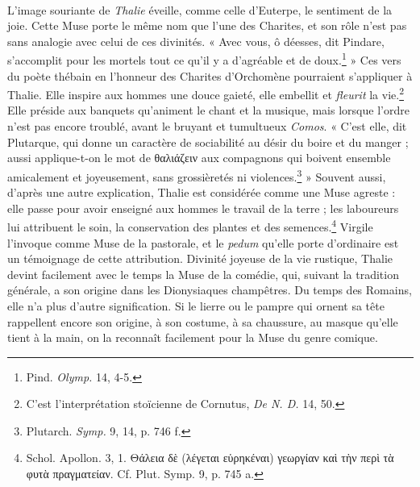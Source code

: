 \documentclass[a4paper, 11pt, oneside, polutonikogreek, french]{article}
\begin{document}
\paragraph{}
L'image souriante de \emph{Thalie} éveille, comme celle d'Euterpe, le sentiment de la joie. Cette Muse porte le même nom que l'une des Charites, et son rôle n'est pas sans analogie avec celui de ces divinités. « Avec vous, ô déesses, dit Pindare, s'accomplit pour les mortels tout ce qu'il y a d'agréable et de doux.\footnote{Pind. \emph{Olymp.} 14, 4-5.} » Ces vers du poète thébain en l'honneur des Charites d'Orchomène pourraient s'appliquer à Thalie. Elle inspire aux hommes une douce gaieté, elle embellit et \emph{fleurit} la vie.\footnote{C'est l'interprétation stoïcienne de Cornutus, \emph{De N. D.} 14, 50.} Elle préside aux banquets qu'animent le chant et la musique, mais lorsque l'ordre n'est pas encore troublé, avant le bruyant et tumultueux \emph{Comos}. « C'est elle, dit Plutarque, qui donne un caractère de sociabilité au désir du boire et du manger ; aussi applique-t-on le mot de θαλιάζειν aux compagnons qui boivent ensemble amicalement et joyeusement, sans grossièretés ni violences.\footnote{Plutarch. \emph{Symp.} 9, 14, p. 746 f.} » Souvent aussi, d'après une autre explication, Thalie est considérée comme une Muse agreste : elle passe pour avoir enseigné aux hommes le travail de la terre ; les laboureurs lui attribuent le soin, la conservation des plantes et des semences.\footnote{Schol. Apollon. 3, 1. Θάλεια δὲ (λέγεται εὑρηκέναι) γεωργίαν καὶ τὴν περὶ τὰ φυτὰ πραγματείαν. Cf. Plut. Symp. 9, p. 745 a.} Virgile l'invoque comme Muse de la pastorale, et le \emph{pedum} qu'elle porte d'ordinaire est un témoignage de cette attribution. Divinité joyeuse de la vie rustique, Thalie devint facilement avec le temps la Muse de la comédie, qui, suivant la tradition générale, a son origine dans les Dionysiaques champêtres. Du temps des Romains, elle n'a plus d'autre signification. Si le lierre ou le pampre qui ornent sa tête rappellent encore son origine, à son costume, à sa chaussure, au masque qu'elle tient à la main, on la reconnaît facilement pour la Muse du genre comique.
\end{document}
